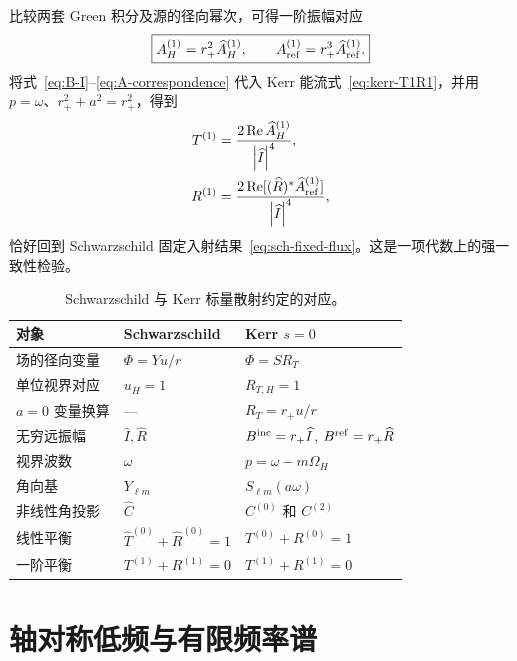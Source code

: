 \documentclass[UTF8,fontset=fandol,12pt,a4paper,oneside,openany]{ctexrep}
\newcommand{\Bin}{B^{\rm inc}}
\newcommand{\Bref}{B^{\rm ref}}
\newcommand{\abs}[1]{\left|#1\right|}
\newcommand{\Ree}{\operatorname{Re}}
\begin{document}
比较两套 Green 积分及源的径向幂次，可得一阶振幅对应
\begin{equation}
\boxed{
A_H^{(1)}=r_+^2\widehat A_H^{(1)},\qquad
A_{\rm ref}^{(1)}=r_+^3\widehat A_{\rm ref}^{(1)}.}
\label{eq:A-correspondence}
\end{equation}
将式~\eqref{eq:B-I}--\eqref{eq:A-correspondence} 代入 Kerr 能流式~\eqref{eq:kerr-T1R1}，并用 $p=\omega$、$r_+^2+a^2=r_+^2$，得到
\begin{align}
T^{(1)}&=\frac{2\Ree\widehat A_H^{(1)}}{\abs{\widehat I}^4},\\
R^{(1)}&=\frac{2\Ree[(\widehat R)^*\widehat A_{\rm ref}^{(1)}]}
{\abs{\widehat I}^4},
\end{align}
恰好回到 Schwarzschild 固定入射结果~\eqref{eq:sch-fixed-flux}。这是一项代数上的强一致性检验。

\begin{table}[H]
\centering
\caption{Schwarzschild 与 Kerr 标量散射约定的对应。}
\label{tab:correspondence}
\begin{tabularx}{\textwidth}{>{\raggedright\arraybackslash}p{}XX}
\toprule
对象 & Schwarzschild & Kerr $s=0$ \\
\midrule
场的径向变量 & $\Phi=Yu/r$ & $\Phi=SR_T$ \\
单位视界对应 & $u_H=1$ & $R_{T,\allowbreak H}=1$ \\
$a=0$ 变量换算 & --- & $R_T=r_+u/r$ \\
无穷远振幅 & $\widehat I,\allowbreak \widehat R$ & $\Bin=r_+\widehat I$, $\Bref=r_+\widehat R$ \\
视界波数 & $\omega$ & $p=\omega-m\Omega_H$ \\
角向基 & $Y_{\ell m}$ & $S_{\ell m}(a\omega)$ \\
非线性角投影 & $\widehat C$ & $C^{(0)}$ 和 $C^{(2)}$ \\
线性平衡 & $\widehat T^{(0)}+\widehat R^{(0)}=1$ & $T^{(0)}+R^{(0)}=1$ \\
一阶平衡 & $T^{(1)}+R^{(1)}=0$ & $T^{(1)}+R^{(1)}=0$ \\
\bottomrule
\end{tabularx}
\end{table}


\chapter{轴对称低频与有限频率谱}
\end{document}
